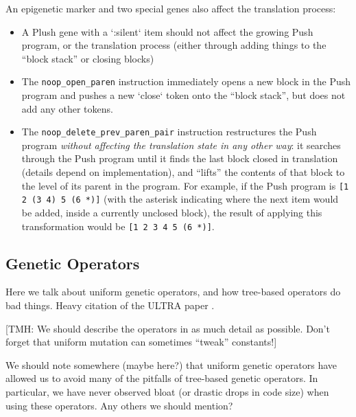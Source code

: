 An epigenetic marker and two special genes also affect the translation process:

\begin{itemize}
\item
A Plush gene with a `:silent` item should not affect the growing Push program, or the translation process (either through adding things to the ``block stack'' or closing blocks)

\item
The  \texttt{noop\_open\_paren} instruction immediately opens a new block in the Push program and pushes a new `close` token onto the ``block stack'', but does not add any other tokens.

\item
The  \texttt{noop\_delete\_prev\_paren\_pair}  instruction restructures the Push program \textit{without affecting the translation state in any other way}: it searches through the Push program until it finds the last block closed in translation (details depend on implementation), and ``lifts'' the contents of that block to the level of its parent in the program. For example, if the Push program is \texttt{[1 2 (3 4) 5 (6 *)]} (with the asterisk indicating where the next item would be added, inside a currently unclosed block), the result of applying this transformation would be \texttt{[1 2 3 4 5 (6 *)]}.

\end{itemize}

\subsection{Genetic Operators}
\label{section:genetic-operators}


Here we talk about uniform genetic operators, and how tree-based operators do bad things. Heavy citation of the ULTRA paper \citep{Spector:2013:GPTP}.

[TMH: We should describe the operators in as much detail as possible. Don't forget that uniform mutation can sometimes ``tweak'' constants!]


We should note somewhere (maybe here?) that uniform genetic operators have allowed us to avoid many of the pitfalls of tree-based genetic operators. In particular, we have never observed bloat (or drastic drops in code size) when using these operators. Any others we should mention?



